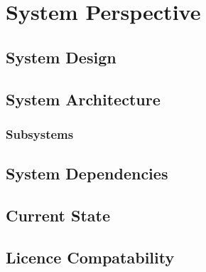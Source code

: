\chapter{System Perspective}

\section{System Design}

\section{System Architecture}

\subsection{Subsystems}

\section{System Dependencies}

\section{Current State}

\section{Licence Compatability}



